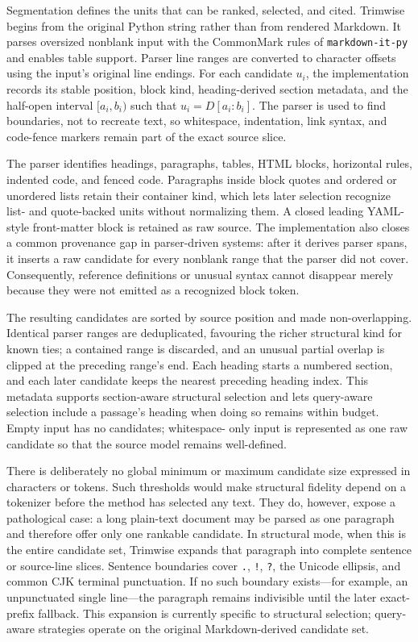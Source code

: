\documentclass[
]{article}
\begin{document}
Segmentation defines the units that can be ranked, selected, and cited.
Trimwise begins from the original Python string rather than from
rendered Markdown. It parses oversized nonblank input with the
CommonMark rules of \texttt{markdown-it-py} and enables table support.
Parser line ranges are converted to character offsets using the input's
original line endings. For each candidate \(u_i\), the implementation
records its stable position, block kind, heading-derived section
metadata, and the half-open interval \([a_i,b_i)\) such that
\(u_i=D[a_i:b_i]\). The parser is used to find boundaries, not to
recreate text, so whitespace, indentation, link syntax, and code-fence
markers remain part of the exact source slice.

The parser identifies headings, paragraphs, tables, HTML blocks,
horizontal rules, indented code, and fenced code. Paragraphs inside
block quotes and ordered or unordered lists retain their container kind,
which lets later selection recognize list- and quote-backed units
without normalizing them. A closed leading YAML-style front-matter block
is retained as raw source. The implementation also closes a common
provenance gap in parser-driven systems: after it derives parser spans,
it inserts a raw candidate for every nonblank range that the parser did
not cover. Consequently, reference definitions or unusual syntax cannot
disappear merely because they were not emitted as a recognized block
token.

The resulting candidates are sorted by source position and made
non-overlapping. Identical parser ranges are deduplicated, favouring the
richer structural kind for known ties; a contained range is discarded,
and an unusual partial overlap is clipped at the preceding range's end.
Each heading starts a numbered section, and each later candidate keeps
the nearest preceding heading index. This metadata supports
section-aware structural selection and lets query-aware selection
include a passage's heading when doing so remains within budget. Empty
input has no candidates; whitespace- only input is represented as one
raw candidate so that the source model remains well-defined.

There is deliberately no global minimum or maximum candidate size
expressed in characters or tokens. Such thresholds would make structural
fidelity depend on a tokenizer before the method has selected any text.
They do, however, expose a pathological case: a long plain-text document
may be parsed as one paragraph and therefore offer only one rankable
candidate. In structural mode, when this is the entire candidate set,
Trimwise expands that paragraph into complete sentence or source-line
slices. Sentence boundaries cover \texttt{.}, \texttt{!}, \texttt{?},
the Unicode ellipsis, and common CJK terminal punctuation. If no such
boundary exists---for example, an unpunctuated single line---the
paragraph remains indivisible until the later exact-prefix fallback.
This expansion is currently specific to structural selection;
query-aware strategies operate on the original Markdown-derived
candidate set.
\end{document}
